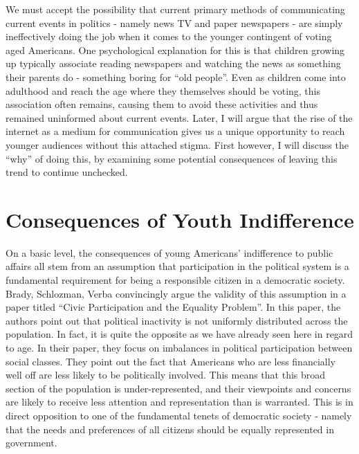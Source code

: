 \documentclass[12pt,letterpaper]{article}
\begin{document}
We must accept the possibility that current primary methods of
communicating current events in politics - namely news TV and paper
newspapers - are simply ineffectively doing the job when it comes to
the younger contingent of voting aged Americans.  One psychological
explanation for this is that children growing up typically associate
reading newspapers and watching the news as something their parents do
- something boring for ``old people''.  Even as children come into
adulthood and reach the age where they themselves should be voting,
this association often remains, causing them to avoid these activities
and thus remained uninformed about current events. Later, I will argue
that the rise of the internet as a medium for communication gives us a
unique opportunity to reach younger audiences without this attached
stigma.  First however, I will discuss the ``why'' of doing this, by
examining some potential consequences of leaving this trend to
continue unchecked. \cite{pbnews} \cite{inter}

\section{Consequences of Youth Indifference} %
\label{sec:Consequences of Youth Indifference}
On a basic level, the consequences of young Americans' indifference to
public affairs all stem from an assumption that participation in the
political system is a fundamental requirement for being a responsible
citizen in a democratic society.  Brady, Schlozman, Verba convincingly
argue the validity of this assumption in a paper titled ``Civic
Participation and the Equality Problem''.  In this paper, the authors
point out that political inactivity is not uniformly distributed
across the population.  In fact, it is quite the opposite as we have
already seen here in regard to age.  In their paper, they focus on
imbalances in political participation between social classes. They
point out the fact that Americans who are less financially well off
are less likely to be politically involved.  This means that this
broad section of the population is under-represented, and their
viewpoints and concerns are likely to receive less attention and
representation than is warranted.  This is in direct opposition to one
of the fundamental tenets of democratic society - namely that the
needs and preferences of all citizens should be equally represented in
government. \cite{civic}
\end{document}
